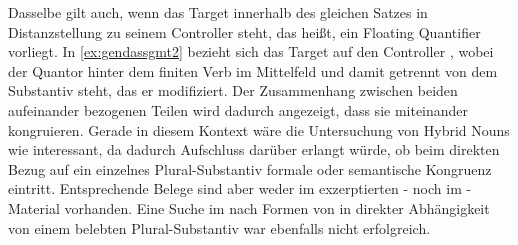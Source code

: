 Dasselbe gilt auch, wenn das Target innerhalb des gleichen Satzes in
Distanzstellung zu seinem Controller steht, das heißt, ein Floating Quantifier
vorliegt. In \cref{ex:gendassgmt2} bezieht sich das Target  auf den
Controller  , wobei der Quantor hinter dem finiten
Verb im Mittelfeld und damit getrennt von dem Substantiv steht, das er
modifiziert. Der Zusammenhang zwischen beiden aufeinander bezogenen Teilen wird
dadurch angezeigt, dass sie miteinander kongruieren. Gerade in diesem Kontext
wäre die Untersuchung von Hybrid Nouns wie  
interessant, da dadurch Aufschluss darüber erlangt würde, ob beim direkten
Bezug auf ein einzelnes Plural-Substantiv formale oder semantische Kongruenz
eintritt. Entsprechende Belege sind aber weder im exzerptierten
\CAO{}- noch im \KC{}-Material vorhanden. Eine Suche im
\REM{} nach Formen von  in direkter Abhängigkeit von einem
belebten Plural-Substantiv war ebenfalls nicht erfolgreich.%
%
